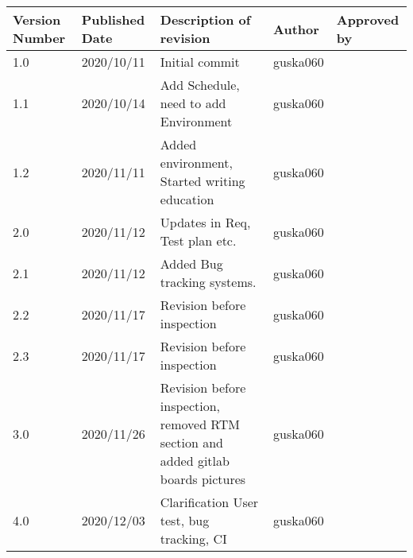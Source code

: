\begin{tabular}{ |p{3cm}|p{3cm}|p{3cm}|p{3cm}|p{3cm}|  }
 

 \hline
 Version Number & Published Date & Description of revision & Author & Approved by \\
 \hline
 1.0   & 2020/10/11  & Initial commit & guska060 &\\
 

 \hline
 1.1   & 2020/10/14   & Add Schedule, need to add Environment & guska060&\\
 
 \hline
 1.2   & 2020/11/11  & Added environment, Started writing education &guska060& \\
 
 \hline
 2.0   & 2020/11/12  & Updates in Req, Test plan etc. &guska060& \\
 
 \hline
 2.1   & 2020/11/12  & Added Bug tracking systems. &guska060& \\
  \hline
 2.2   & 2020/11/17  & Revision before inspection  &guska060&\\
 
 \hline
 2.3   & 2020/11/17  & Revision before inspection &guska060& \\
 
 \hline
  3.0   & 2020/11/26  & Revision before inspection, removed RTM section and added gitlab boards pictures &guska060& \\
 
 \hline
   4.0   & 2020/12/03  & Clarification User test, bug tracking, CI &guska060& \\
 
\hline
\end{tabular}